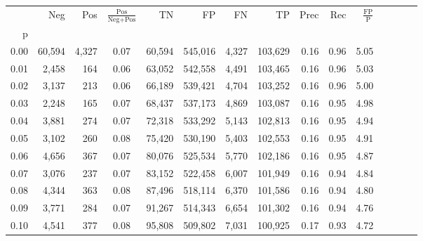 \begin{tabular}{rrrcrrrrrrrrrrr}
\toprule
{} &     Neg &     Pos & $\frac{\text{Pos}}{\text{Neg}+\text{Pos}}$ &       TN &       FP &       FN &       TP &  Prec &   Rec & $\frac{\text{FP}}{\text{P}}$ \\
p    &         &         &                                            &          &          &          &          &       &       &                              \\
\midrule
0.00 &  60,594 &   4,327 &                                       0.07 &   60,594 &  545,016 &    4,327 &  103,629 &  0.16 &  0.96 &                         5.05 \\
0.01 &   2,458 &     164 &                                       0.06 &   63,052 &  542,558 &    4,491 &  103,465 &  0.16 &  0.96 &                         5.03 \\
0.02 &   3,137 &     213 &                                       0.06 &   66,189 &  539,421 &    4,704 &  103,252 &  0.16 &  0.96 &                         5.00 \\
0.03 &   2,248 &     165 &                                       0.07 &   68,437 &  537,173 &    4,869 &  103,087 &  0.16 &  0.95 &                         4.98 \\
0.04 &   3,881 &     274 &                                       0.07 &   72,318 &  533,292 &    5,143 &  102,813 &  0.16 &  0.95 &                         4.94 \\
0.05 &   3,102 &     260 &                                       0.08 &   75,420 &  530,190 &    5,403 &  102,553 &  0.16 &  0.95 &                         4.91 \\
0.06 &   4,656 &     367 &                                       0.07 &   80,076 &  525,534 &    5,770 &  102,186 &  0.16 &  0.95 &                         4.87 \\
0.07 &   3,076 &     237 &                                       0.07 &   83,152 &  522,458 &    6,007 &  101,949 &  0.16 &  0.94 &                         4.84 \\
0.08 &   4,344 &     363 &                                       0.08 &   87,496 &  518,114 &    6,370 &  101,586 &  0.16 &  0.94 &                         4.80 \\
0.09 &   3,771 &     284 &                                       0.07 &   91,267 &  514,343 &    6,654 &  101,302 &  0.16 &  0.94 &                         4.76 \\
0.10 &   4,541 &     377 &                                       0.08 &   95,808 &  509,802 &    7,031 &  100,925 &  0.17 &  0.93 &                         4.72 \\

\end{tabular}
